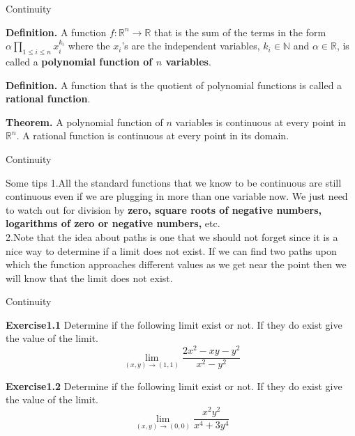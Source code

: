 \documentclass{beamer}
\begin{document}
    \begin{frame}[t]{Continuity}
        \begin{block}
            \par \textbf{Definition.} A function $f: \mathbb{R}^n \to \mathbb{R}$ that is the sum of the terms in the form $\alpha \prod_{1 \leq i \leq n} x_i^{k_i}$ where the $x_i$'s are the independent variables, $k_i \in \mathbb{N}$ and $\alpha \in \mathbb{R}$, is called a \textbf{polynomial function of $n$ variables}.

            \par \textbf{Definition.} A function that is the quotient of polynomial functions is called a \textbf{rational function}.
        \end{block}

        \begin{block}
            \par \textbf{Theorem.} A polynomial function of $n$ variables is continuous at every point in $\mathbb{R}^n$. A rational function is continuous at every point in its domain.
        \end{block}
    \end{frame}
    
    
    \begin{frame}[t]{Continuity}
        \begin{block}{Some tips}
            1.All the standard functions that we know to be continuous are still continuous even if we are plugging in more than one variable now. We just need to watch out for division by \textbf{zero, square roots of negative numbers, logarithms of zero or negative numbers,} etc.\\
            2.Note that the idea about paths is one that we should not forget since it is a nice way to determine if a limit does not exist. If we can find two paths upon which the function approaches different values as we get near the point then we will know that the limit does not exist.
        \end{block}
        
    \end{frame}
    
    \begin{frame}{Continuity}
        \par\textbf{Exercise1.1} Determine if the following limit exist or not. If they do exist give the value of the limit.
        \begin{equation*}
            \lim_{(x,y)\to(1,1)}\frac{2x^2-xy-y^2}{x^2-y^2}
        \end{equation*}
        \par\textbf{Exercise1.2} Determine if the following limit exist or not. If they do exist give the value of the limit.
        \begin{equation*}
            \lim_{(x,y)\to(0,0)}\frac{x^2y^2}{x^4+3y^4}
        \end{equation*}
    \end{frame}
\end{document}
